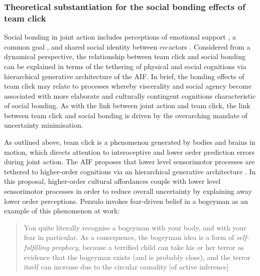 \begin{CJK}{UTF8}{gbsn}
\subsubsection{Theoretical substantiation for the social bonding effects of team click\label{sect:clickBondingAIF}}


Social bonding in joint action includes perceptions of emotional support \citep{Wheatley2012}, a common goal \citep[see][]{Dunbar2012,Wolf2015}, and shared social identity between co-actors \citep{Whitehouse2014}.  Considered from a dynamical perspective, the relationship between team click and social bonding can be explained in terms of the tethering of physical and social cognitions via hierarchical generative architecture of the AIF.  In brief, the bonding effects of team click may relate to processes whereby viscerality and social agency become associated with more elaborate and culturally contingent cognitions characteristic of social bonding.  As with the link between joint action and team click, the link between team click and social bonding is driven by the overarching mandate of uncertainty minimisation.

As outlined above, team click is a phenomenon generated by bodies and brains in motion, which directs attention to interoceptive and lower order prediction errors during joint action.  The AIF proposes that lower level sensorimotor processes are tethered to higher-order cognitions via an hierarchical generative architecture \citep{Ramstead2016}.  In this proposal, higher-order cultural affordances couple with lower level sensorimotor processes in order to reduce overall uncertainty by explaining away lower order perceptions.  Pezzulo invokes fear-driven belief in a bogeyman as an example of this phenomenon at work:

    \begin{quote}
      You quite literally recognise a bogeyman with your body, and with your fear in particular.  As a consequence, the bogeyman idea is a form of \textit{self-fulfilling prophecy}, because a terrified child can take his or her terror as evidence that the bogeyman exists (and is probably close), and the terror itself can increase due to the circular causality [of active inference] \citep[909]{Pezzulo2014}
    \end{quote}


\end{CJK}
